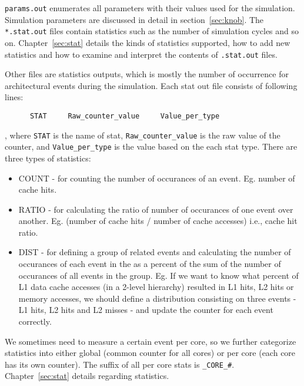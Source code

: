 \noindent \Verb+params.out+ enumerates all parameters with their values used
for the simulation. Simulation parameters are discussed in detail in 
section~\ref{sec:knob}. The \Verb+*.stat.out+ files contain statistics such as the number
of simulation cycles and so on. Chapter~\ref{sec:stat} details the kinds of
statistics supported, how to add new statistics and how to examine and
interpret the contents of \Verb+.stat.out+ files.


\ignore
	  {
	  Other files are statistics outputs, which is mostly the number
	  of occurrence for architectural events during the simulation. Each
	  stat out file consists of following lines:

	  \begin{Verbatim}
	  STAT     Raw_counter_value     Value_per_type
	  \end{Verbatim}

	  \noindent
	  , where \Verb+STAT+ is the name of stat, \Verb+Raw_counter_value+ is
	  the raw value of the counter, and \Verb+Value_per_type+ is the value
	  based on the each stat type. There are three types of statistics:

	  \begin{itemize}

		\item COUNT - for counting the number of occurances of an event. Eg. number
		of cache hits. 

		\item RATIO - for calculating the ratio of number of occurances of one event
		over another. Eg. (number of cache hits / number of cache accesses) i.e.,
		cache hit ratio.

		\item DIST - for defining a group of related events and calculating the
		number of occurances of each event in the as a percent of the sum of the
		number of occurances of all events in the group.  Eg. If we want to know what
		percent of L1 data cache accesses (in a 2-level hierarchy) resulted in L1
		hits, L2 hits or memory accesses, we should define a distribution consisting
		on three events - L1 hits, L2 hits and L2 misses  - and update the
		counter for each event correctly. 
	  \end{itemize}


	  \noindent
	  We sometimes need to measure a certain event per core, so we further
	  categorize statistics into either global (common counter for all
	  cores) or per core (each core has its own counter). The suffix of all
	  per core stats is \Verb+_CORE_#+. Chapter~\ref{sec:stat} details
	  regarding statistics.


}
